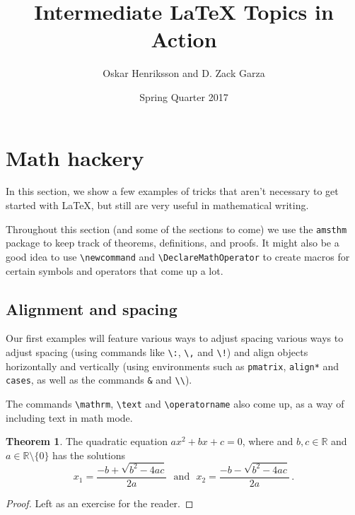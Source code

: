 \documentclass[11pt,letterpaper,titlepage]{article}
\title{\vspace{-2in} \huge Intermediate {\LaTeX} Topics in Action}
\author{\Large Oskar Henriksson and D. Zack Garza}
\date{\Large Spring Quarter 2017}
\numberwithin{equation}{section}
\numberwithin{figure}{section}
\numberwithin{table}{section}
\numberwithin{algorithm}{section}
\theoremstyle{definition}
\newtheorem{theorem}{Theorem}[section] %
\begin{document}
\maketitle
\thispagestyle{empty} %
\tableofcontents
\newpage
\setcounter{page}{1} %


\section{Math hackery}
In this section, we show a few examples of tricks that aren't necessary to get started with \LaTeX, but still are very useful in mathematical writing.

Throughout this section (and some of the sections to come) we use the \verb$amsthm$ package to keep track of theorems, definitions, and proofs. It might also be a good idea to use \verb$\newcommand$ and \verb$\DeclareMathOperator$ to create macros for certain symbols and operators that come up a lot.

\subsection{Alignment and spacing}
\label{su:alignment}
Our first examples will feature various ways to adjust spacing various ways to adjust spacing (using commands like \verb$\:$, \verb$\,$ and \verb$\!$) and align objects horizontally and vertically (using environments such as {\verb$pmatrix$}, {\verb$align*$} and {\verb$cases$}, as well as the commands {\verb$&$} and \verb$\\$).

The commands \verb$\mathrm$, \verb$\text$ and \verb$\operatorname$ also come up, as a way of including text in math mode.

\begin{theorem}
    The quadratic equation $ax^2+bx+c=0$, where and $b,c\in\mathbb{R}$ and $a\in\mathbb{R}\setminus \{0\}$ has the solutions
    \[x_1 = \frac{-b+\sqrt{b^2-4ac}}{2a}\:\:\:\text{and}\:\:\:
    x_2 = \frac{-b-\sqrt{b^2-4ac}}{2a}\,.\]
\end{theorem}

\begin{proof}
    Left as an exercise for the reader.
\end{proof}
\end{document}
